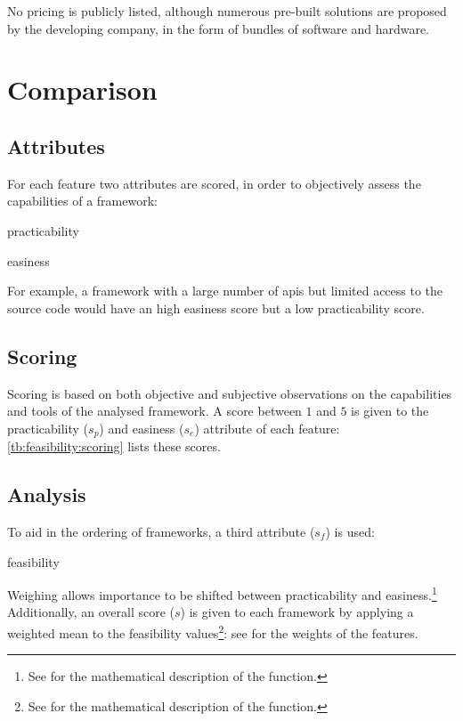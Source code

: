 No pricing is publicly listed, although numerous pre-built solutions are proposed by the developing company, in the form of bundles of software and hardware.

\section{Comparison}\label{sc:feasibility:comparison}

\subsection{Attributes}

For each \gls{feature} two \glspl{attribute} are scored, in order to objectively assess the capabilities of a \gls{framework}:

\begin{definition}{practicability}
\end{definition}

\begin{definition}{easiness}
\end{definition}

For example, a framework with a large number of \glspl{api} but limited access to the source code would have an high \gls{easiness} score but a low \gls{practicability} score.

\subsection{Scoring}

Scoring is based on both objective and subjective observations on the capabilities and tools of the analysed \gls{framework}. A score between $1$ and $5$ is given to the \gls{practicability} ($s_p$) and \gls{easiness} ($s_e$) \gls{attribute} of each \gls{feature}: \cref{tb:feasibility:scoring} lists these scores.



\subsection{Analysis}

To aid in the ordering of \glspl{framework}, a third \gls{attribute} ($s_f$) is used:

\begin{definition}{feasibility}
\end{definition}

Weighing allows importance to be shifted between \gls{practicability} and \gls{easiness}.\footnote{See  for the mathematical description of the function.} Additionally, an overall score ($s$) is given to each \gls{framework} by applying a weighted mean to the \gls{feasibility} values\footnote{See  for the mathematical description of the function.}: see  for the weights of the \glspl{feature}.

